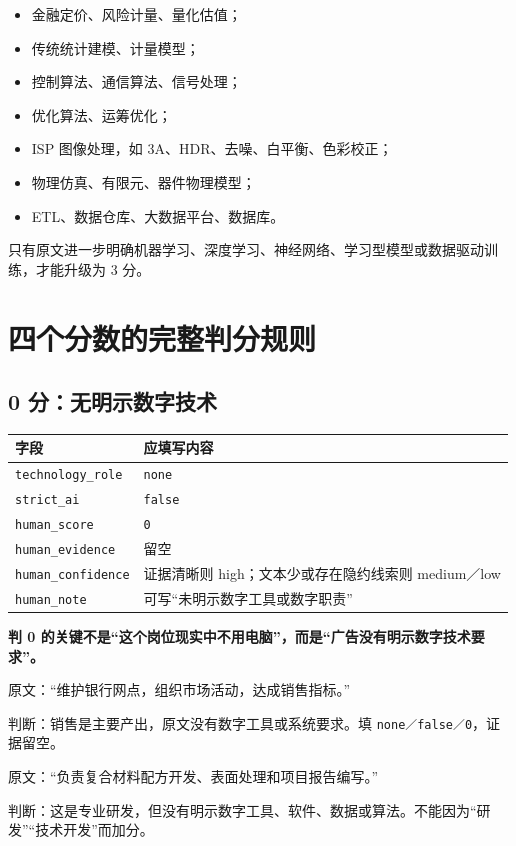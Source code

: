 \documentclass[11pt,a4paper,fontset=none]{ctexart}
\newcommand{\field}[1]{\nolinkurl{#1}}
\begin{document}
\begin{itemize}
  \item 金融定价、风险计量、量化估值；
  \item 传统统计建模、计量模型；
  \item 控制算法、通信算法、信号处理；
  \item 优化算法、运筹优化；
  \item ISP 图像处理，如 3A、HDR、去噪、白平衡、色彩校正；
  \item 物理仿真、有限元、器件物理模型；
  \item ETL、数据仓库、大数据平台、数据库。
\end{itemize}

只有原文进一步明确机器学习、深度学习、神经网络、学习型模型或数据驱动训练，才能升级为 3 分。

\section{四个分数的完整判分规则}

\subsection{0 分：无明示数字技术}

\noindent\begin{tabularx}{\textwidth}{L{3.1cm}Y}
\toprule
字段 & 应填写内容\\
\midrule
\field{technology_role} & \texttt{none}\\
\field{strict_ai} & \texttt{false}\\
\field{human_score} & \texttt{0}\\
\field{human_evidence} & 留空\\
\field{human_confidence} & 证据清晰则 high；文本少或存在隐约线索则 medium／low\\
\field{human_note} & 可写“未明示数字工具或数字职责”\\
\bottomrule
\end{tabularx}

\textbf{判 0 的关键不是“这个岗位现实中不用电脑”，而是“广告没有明示数字技术要求”。}

\begin{examplebox}[0 分例 1：普通渠道销售]
原文：“维护银行网点，组织市场活动，达成销售指标。”

判断：销售是主要产出，原文没有数字工具或系统要求。填 \texttt{none／false／0}，证据留空。
\end{examplebox}

\begin{examplebox}[0 分例 2：材料研发]
原文：“负责复合材料配方开发、表面处理和项目报告编写。”

判断：这是专业研发，但没有明示数字工具、软件、数据或算法。不能因为“研发”“技术开发”而加分。
\end{examplebox}
\end{document}

